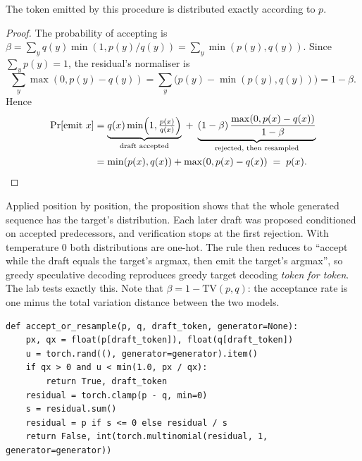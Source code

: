 \begin{proposition}\label{prop:efficient:exact}
The token emitted by this procedure is distributed exactly according to $p$.
\end{proposition}
\begin{proof}
The probability of accepting is
$\beta=\sum_y q(y)\min(1,p(y)/q(y))=\sum_y \min(p(y),q(y))$. Since
$\sum_y p(y)=1$, the residual's normaliser is
\[
\textstyle\sum_y \max(0,p(y)-q(y)) = \sum_y \big(p(y)-\min(p(y),q(y))\big) = 1-\beta .
\]
Hence
\begin{align*}
\Pr[\text{emit } x] &= \underbrace{q(x)\min\!\Big(1,\tfrac{p(x)}{q(x)}\Big)}_{\text{draft accepted}}
\;+\; \underbrace{(1-\beta)\,\frac{\max(0,p(x)-q(x))}{1-\beta}}_{\text{rejected, then resampled}}\\
&= \min(p(x),q(x)) + \max(0,p(x)-q(x)) \;=\; p(x). \qedhere
\end{align*}
\end{proof}

Applied position by position, the proposition shows that the whole generated sequence
has the target's distribution. Each later draft was proposed conditioned on accepted
predecessors, and verification stops at the first rejection. With temperature 0 both
distributions are one-hot. The rule then reduces to ``accept while the draft equals the
target's argmax, then emit the target's argmax'', so greedy speculative decoding
reproduces greedy target decoding \emph{token for token}. The lab tests exactly this.
Note that $\beta = 1-\mathrm{TV}(p,q)$: the acceptance rate is one minus the total
variation distance between the two models.

\begin{lstlisting}[caption={The accept-or-resample rule (\ident{llmsys/specdec.py}).},
label={lst:efficient:accept}]
def accept_or_resample(p, q, draft_token, generator=None):
    px, qx = float(p[draft_token]), float(q[draft_token])
    u = torch.rand((), generator=generator).item()
    if qx > 0 and u < min(1.0, px / qx):
        return True, draft_token
    residual = torch.clamp(p - q, min=0)
    s = residual.sum()
    residual = p if s <= 0 else residual / s
    return False, int(torch.multinomial(residual, 1, generator=generator))
\end{lstlisting}

